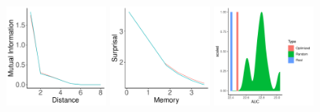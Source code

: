\begin{figure}
	\begin{center}
\includegraphics[width=0.3\textwidth]{figures/Sesotho-suffixes-byPhonemes-it-heldout.pdf}
\includegraphics[width=0.3\textwidth]{figures/Sesotho-suffixes-byPhonemes-memsurp-heldout.pdf}
\includegraphics[width=0.3\textwidth]{figures/Sesotho-suffixes-byPhonemes-auc-hist-heldout.pdf}


\end{center}
\end{figure}
